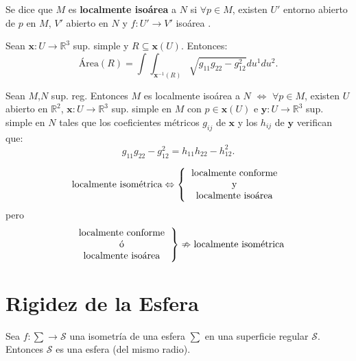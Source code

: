 \documentclass[twoside]{report}
\begin{document}
\begin{defi}
Se dice que $M$ es \textbf{localmente iso\'area} a $N$ si $\forall p \in M$, existen $U'$ entorno abierto de $p$ en $M$, $V'$ abierto en $N$ y $f: U' \rightarrow V'$ iso\'area .
\end{defi}

\begin{reco}
Sean $\textbf{x} : U\longrightarrow \mathbb{R}^3$ sup. simple y $R\subseteq \textbf{x}(U)$. Entonces: $$\mbox{\'Area}(R) = \int\!\!\!\!\int_{\textbf{x}^{-1}(R)} \sqrt{g_{11}g_{22}- g_{12}^2} du^1du^2.$$
\end{reco}

\begin{teorema}
Sean $M$,$N$ sup. reg. Entonces $M$ es localmente iso\'area a $N$ $\Leftrightarrow$ $\forall p \in M$, existen $U$ abierto en $\mathbb{R}^2$, $\textbf{x}: U\rightarrow \mathbb{R}^3$ sup. simple en $M$ con $p\in \textbf{x}(U)$ e $\textbf{y}: U\rightarrow \mathbb{R}^3$ sup. simple en $N$ tales que los coeficientes m\'etricos $g_{ij}$ de $\textbf{x}$ y los $h_{ij}$ de $\textbf{y}$ verifican que: $$g_{11}g_{22}-g_{12}^2= h_{11}h_{22}-h_{12}^2.$$
\end{teorema}

\begin{nota}
$$\text{localmente isom\'etrica}
\Leftrightarrow
\left\{\begin{tabular}{c}
localmente conforme\\
y\\
localmente iso\'area
\end{tabular} \right.
$$
pero
$$\left.\begin{tabular}{c}
localmente conforme \\
\'o \\
localmente iso\'area
\end{tabular}\right\}
\nRightarrow
\text{localmente isom\'etrica}$$
\end{nota}

\section{Rigidez de la Esfera}

\begin{teorema}
Sea $f : \sum \longrightarrow \mathcal{S}$ una isometr\'ia de una esfera $\sum$ en una superficie regular $\mathcal{S}$. Entonces $\mathcal{S}$ es una esfera (del mismo radio).
\end{teorema}
\end{document}
